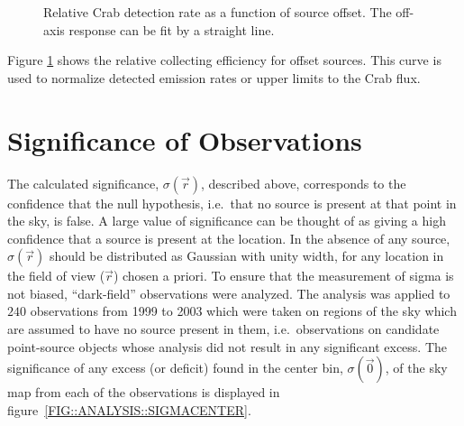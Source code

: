 \begin{figure}[p]
\centerline{}
\caption{\label{FIG::ANALYSIS::2DRATE} Relative Crab detection rate as 
a function of source offset. The off-axis response can be fit by a 
straight line.}
\end{figure}

Figure \ref{FIG::ANALYSIS::2DRATE} shows the relative collecting
efficiency for offset sources. This curve is used to normalize
detected emission rates or upper limits to the Crab flux. 

\section{Significance of Observations}
\label{SEC::ANALYSIS::SIGNIFICANCE}

The calculated significance, $\sigma(\vec{r})$, described above,
corresponds to the confidence that the null hypothesis, i.e.\ that no
source is present at that point in the sky, is false. A large value of
significance can be thought of as giving a high confidence that a
source is present at the location. In the absence of any source,
$\sigma(\vec{r})$ should be distributed as Gaussian with unity width,
for any location in the field of view ($\vec{r}$) chosen a priori. To
ensure that the measurement of sigma is not biased, ``dark-field''
observations were analyzed. The analysis was applied to $240$
observations from 1999 to 2003 which were taken on regions of the sky
which are assumed to have no source present in them, i.e.\
observations on candidate point-source objects whose analysis did not
result in any significant excess. The significance of any excess (or
deficit) found in the center bin, $\sigma(\vec{0})$, of the sky map
from each of the observations is displayed in
figure~\ref{FIG::ANALYSIS::SIGMACENTER}.

